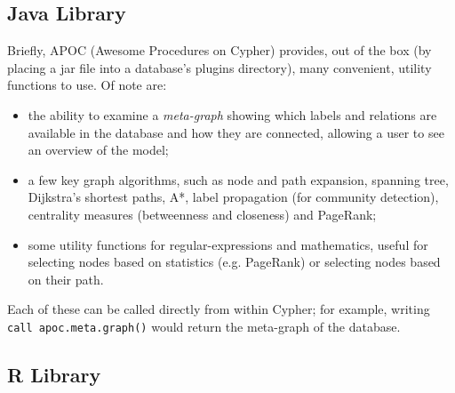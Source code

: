 \subsection{Java Library}

Briefly, APOC (Awesome Procedures on Cypher) provides, out of the box (by
placing a jar file into a database's plugins directory), many convenient,
utility functions to use. Of note are:

\begin{itemize}

  \item the ability to examine a \emph{meta-graph} showing which labels and
    relations are available in the database and how they are connected, allowing
    a user to see an overview of the model;

  \item a few key graph algorithms, such as node and path expansion, spanning
    tree, Dijkstra's shortest paths, A*, label propagation (for community
    detection), centrality measures (betweenness and closeness) and PageRank;

  \item some utility functions for regular-expressions and mathematics, useful
    for selecting nodes based on statistics (e.g. PageRank) or selecting nodes
    based on their path.

\end{itemize}

Each of these can be called directly from within Cypher; for example, writing
\texttt{call apoc.meta.graph()} would return the meta-graph of the database.

%

\subsection{R Library}

